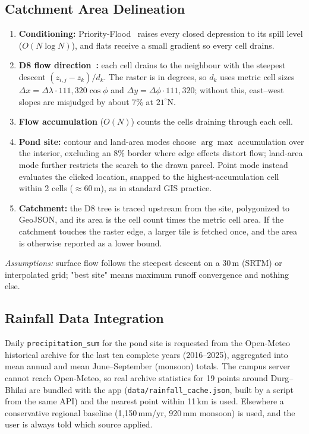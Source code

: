 \documentclass[manuscript,screen,review]{acmart}
\begin{document}
\subsection{Catchment Area Delineation}
\begin{enumerate}
    \item \textbf{Conditioning:} Priority-Flood~\cite{barnes2014} raises every closed depression to its spill level ($O(N\log N)$), and flats receive a small gradient so every cell drains.
    \item \textbf{D8 flow direction~\cite{ocallaghan1984}:} each cell drains to the neighbour with the steepest descent $(z_{i,j}-z_k)/d_k$. The raster is in degrees, so $d_k$ uses metric cell sizes $\Delta x = \Delta\lambda\cdot111{,}320\cos\phi$ and $\Delta y = \Delta\phi\cdot111{,}320$; without this, east--west slopes are misjudged by about 7\% at $21^\circ$N.
    \item \textbf{Flow accumulation} ($O(N)$) counts the cells draining through each cell.
    \item \textbf{Pond site:} contour and land-area modes choose $\arg\max$ accumulation over the interior, excluding an 8\% border where edge effects distort flow; land-area mode further restricts the search to the drawn parcel. Point mode instead evaluates the clicked location, snapped to the highest-accumulation cell within 2 cells ($\approx$60\,m), as in standard GIS practice.
    \item \textbf{Catchment:} the D8 tree is traced upstream from the site, polygonized to GeoJSON, and its area is the cell count times the metric cell area. If the catchment touches the raster edge, a larger tile is fetched once, and the area is otherwise reported as a lower bound.
\end{enumerate}
\emph{Assumptions:} surface flow follows the steepest descent on a 30\,m (SRTM) or interpolated grid; "best site" means maximum runoff convergence and nothing else.

\subsection{Rainfall Data Integration}
Daily \texttt{precipitation\_sum} for the pond site is requested from the Open-Meteo historical archive for the last ten complete years (2016--2025), aggregated into mean annual and mean June--September (monsoon) totals. The campus server cannot reach Open-Meteo, so real archive statistics for 19 points around Durg--Bhilai are bundled with the app (\texttt{data/rainfall\_cache.json}, built by a script from the same API) and the nearest point within 11\,km is used. Elsewhere a conservative regional baseline (1,150\,mm/yr, 920\,mm monsoon) is used, and the user is always told which source applied.
\end{document}
